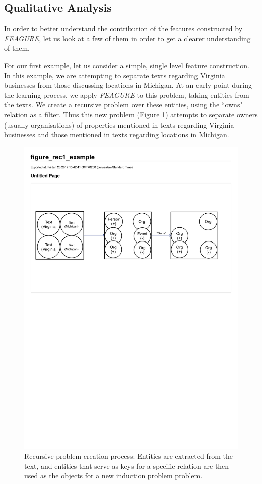 \documentclass[twoside,11pt]{article}
\theoremstyle{definition}
\begin{document}
\subsection{Qualitative Analysis}

In order to better understand the contribution of the features constructed by \emph{FEAGURE}, let us look at a few of them in order to get a clearer understanding of them.

For our first example, let us consider a simple, single level feature construction.
In this example, we are attempting to separate texts regarding Virginia businesses from those discussing locations in Michigan. At an early point during the learning process, we apply \emph{FEAGURE} to this problem, taking entities from the texts. We create a recursive problem over these entities, using the ``owns" relation as a filter. Thus this new problem (Figure \ref{fig:figure_rec1_example}) attempts to separate owners (usually organisations) of properties mentioned in texts regarding Virginia businesses and those mentioned in texts regarding locations in Michigan.

\begin{figure}[!h]
	\centering
	\includegraphics[width=\linewidth]{figure_rec1_example}
	\caption{Recursive problem creation process: Entities are extracted from the text, and entities that serve as keys for a specific relation are then used as the objects for a new induction problem problem.}
	\label{fig:figure_rec1_example}
\end{figure}
\end{document}
